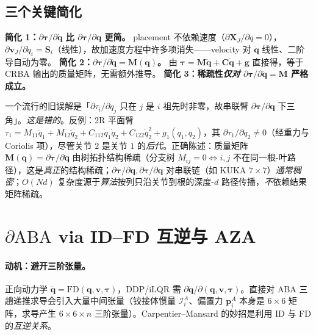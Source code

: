 \subsection{三个关键简化}
\textbf{简化 1：$\partial\boldsymbol\tau/\partial\dot{\mathbf q}$ 比 $\partial\boldsymbol\tau/\partial\mathbf q$ 更简。} placement 不依赖速度（$\partial\mathbf X_J/\partial\dot q=0$），$\partial\mathbf v_J/\partial\dot q_i=\mathbf S_i$（线性），故加速度方程中许多项消失——velocity 对 $\dot{\mathbf q}$ 线性、二阶导自动为零。\;
\textbf{简化 2：$\partial\boldsymbol\tau/\partial\ddot{\mathbf q}=\mathbf M(\mathbf q)$。} 由 $\boldsymbol\tau=\mathbf M\ddot{\mathbf q}+\mathbf C\dot{\mathbf q}+\mathbf g$ 直接得，等于 CRBA 输出的质量矩阵，无需额外推导。\;
\textbf{简化 3：稀疏性\emph{仅对} $\partial\boldsymbol\tau/\partial\ddot{\mathbf q}=\mathbf M$ 严格成立。}

\begin{pitfall}
一个流行的旧误解是「$\partial\tau_i/\partial q_j$ 只在 $j$ 是 $i$ 祖先时非零，故串联臂 $\partial\boldsymbol\tau/\partial\mathbf q$ 下三角」。\emph{这是错的}。反例：2R 平面臂 $\tau_1=M_{11}\ddot q_1+M_{12}\ddot q_2+C_{112}\dot q_1\dot q_2+C_{122}\dot q_2^2+g_1(q_1,q_2)$，其 $\partial\tau_1/\partial q_2\neq0$（经重力与 Coriolis 项），尽管关节 $2$ 是关节 $1$ 的\emph{后代}。正确陈述：质量矩阵 $\mathbf M(\mathbf q)=\partial\boldsymbol\tau/\partial\ddot{\mathbf q}$ 由树拓扑结构稀疏（分支树 $M_{ij}=0\iff i,j$ 不在同一根-叶路径），这是\emph{真正}的结构稀疏；$\partial\boldsymbol\tau/\partial\mathbf q,\partial\boldsymbol\tau/\partial\dot{\mathbf q}$ 对串联链（如 KUKA $7\times7$）\emph{通常稠密}；$O(Nd)$ 复杂度源于\emph{算法}按列只沿关节到根的深度-$d$ 路径传播，\emph{不}依赖结果矩阵稀疏。
\end{pitfall}

\section{\texorpdfstring{$\partial\mathrm{ABA}$}{dABA} via ID--FD 互逆与 AZA}
\label{sec:cd-daba}

\paragraph{动机：避开三阶张量。}
正向动力学 $\ddot{\mathbf q}=\mathrm{FD}(\mathbf q,\mathbf v,\boldsymbol\tau)$，DDP/iLQR 需 $\partial\ddot{\mathbf q}/\partial(\mathbf q,\mathbf v,\boldsymbol\tau)$。直接对 ABA 三趟递推求导会引入大量中间张量（铰接体惯量 $\mathcal I_i^A$、偏置力 $\mathbf p_i^A$ 本身是 $6\times6$ 矩阵，求导产生 $6\times6\times n$ 三阶张量）。Carpentier--Mansard 的妙招是利用 ID 与 FD 的\emph{互逆关系}。

